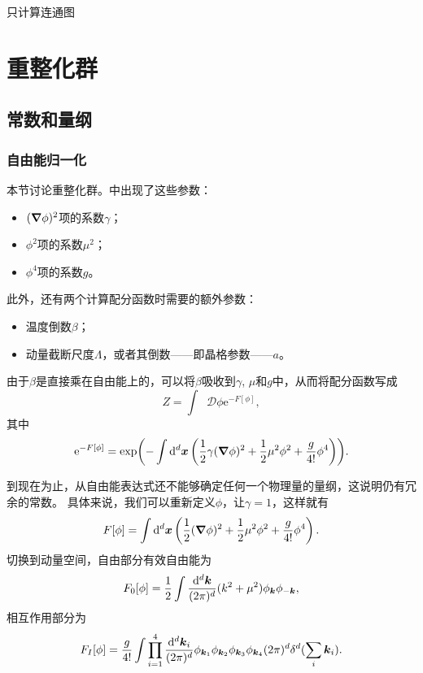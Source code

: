 \documentclass[hyperref, UTF8, a4paper]{ctexart}
\newcommand*{\ee}{\mathrm{e}}
\newcommand*{\fd}[1]{\mathop{}\!\mathcal{D} #1}
\renewcommand{\autoref}{\prettyref}
\begin{document}
只计算连通图


\section{重整化群}\label{sec:ising-rg}

\subsection{常数和量纲}

\subsubsection{自由能归一化}

本节讨论重整化群。\autoref{eq:phi-4-g}中出现了这些参数：
\begin{itemize}
    \item $(\grad{\phi})^2$项的系数$\gamma$；
    \item $\phi^2$项的系数$\mu^2$；
    \item $\phi^4$项的系数$g$。
\end{itemize}
此外，还有两个计算配分函数时需要的额外参数：
\begin{itemize}
    \item 温度倒数$\beta$；
    \item 动量截断尺度$\Lambda$，或者其倒数——即晶格参数——$a$。
\end{itemize}
由于$\beta$是直接乘在自由能上的，可以将$\beta$吸收到$\gamma$, $\mu$和$g$中，从而将配分函数写成
\[
    Z = \int \fd{\phi} \ee^{-F[\phi]},
\]
其中
\[
    \ee^{-F[\phi]} = \exp(-\int \dd[d]{\vb*{x}} \left(
        \frac{1}{2} \gamma (\grad{\phi})^2 + \frac{1}{2} \mu^2 \phi^2 + \frac{g}{4!} \phi^4
    \right) ).
\]

到现在为止，从自由能表达式还不能够确定任何一个物理量的量纲，这说明仍有冗余的常数。
具体来说，我们可以重新定义$\phi$，让$\gamma=1$，这样就有
\begin{equation}
    F[\phi] = \int \dd[d]{\vb*{x}} \left(
        \frac{1}{2} (\grad{\phi})^2 + \frac{1}{2} \mu^2 \phi^2 + \frac{g}{4!} \phi^4
    \right).
    \label{eq:normalized-phi4}
\end{equation}
切换到动量空间，自由部分有效自由能为
\begin{equation}
    F_0[\phi] = \frac{1}{2} \int \frac{\dd[d]{\vb*{k}}}{(2\pi)^d} (k^2 + \mu^2) \phi_{\vb*{k}} \phi_{-\vb*{k}},
\end{equation}
相互作用部分为
\begin{equation}
    F_I[\phi] = \frac{g}{4!} \int \prod_{i=1}^4 \frac{\dd[d]{\vb*{k}_i}}{(2\pi)^d} \phi_{\vb*{k}_1} \phi_{\vb*{k}_2} \phi_{\vb*{k}_3} \phi_{\vb*{k}_4} (2\pi)^d \delta^d(\sum_{i} \vb*{k}_i).
    \label{eq:interactive-free-energy}
\end{equation}
\end{document}
